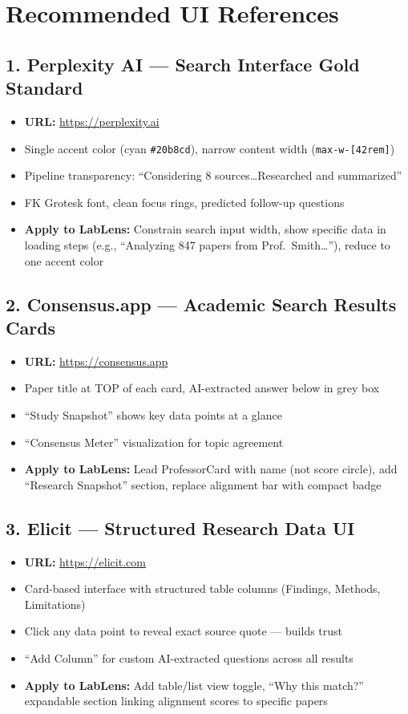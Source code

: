 \documentclass[11pt,letterpaper]{article}
\begin{document}
\section{Recommended UI References}

\subsection{1. Perplexity AI --- Search Interface Gold Standard}
\begin{itemize}[nosep]
    \item \textbf{URL:} \url{https://perplexity.ai}
    \item Single accent color (cyan \texttt{\#20b8cd}), narrow content width (\texttt{max-w-[42rem]})
    \item Pipeline transparency: ``Considering 8 sources\ldots Researched and summarized''
    \item FK Grotesk font, clean focus rings, predicted follow-up questions
    \item \textbf{Apply to LabLens:} Constrain search input width, show specific data in loading steps (e.g., ``Analyzing 847 papers from Prof.\ Smith\ldots''), reduce to one accent color
\end{itemize}

\subsection{2. Consensus.app --- Academic Search Results Cards}
\begin{itemize}[nosep]
    \item \textbf{URL:} \url{https://consensus.app}
    \item Paper title at TOP of each card, AI-extracted answer below in grey box
    \item ``Study Snapshot'' shows key data points at a glance
    \item ``Consensus Meter'' visualization for topic agreement
    \item \textbf{Apply to LabLens:} Lead ProfessorCard with name (not score circle), add ``Research Snapshot'' section, replace alignment bar with compact badge
\end{itemize}

\subsection{3. Elicit --- Structured Research Data UI}
\begin{itemize}[nosep]
    \item \textbf{URL:} \url{https://elicit.com}
    \item Card-based interface with structured table columns (Findings, Methods, Limitations)
    \item Click any data point to reveal exact source quote --- builds trust
    \item ``Add Column'' for custom AI-extracted questions across all results
    \item \textbf{Apply to LabLens:} Add table/list view toggle, ``Why this match?'' expandable section linking alignment scores to specific papers
\end{itemize}
\end{document}
